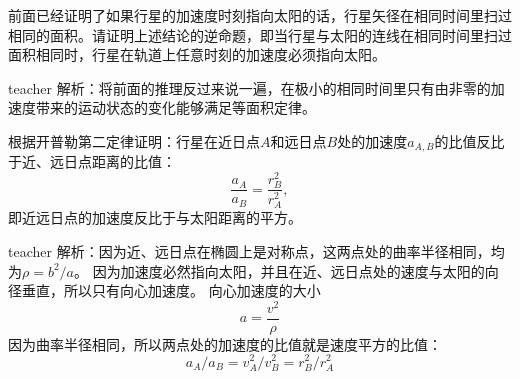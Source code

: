 \begin{example}
前面已经证明了如果行星的加速度时刻指向太阳的话，行星矢径在相同时间里扫过相同的面积。请证明上述结论的逆命题，即当行星与太阳的连线在相同时间里扫过面积相同时，行星在轨道上任意时刻的加速度必须指向太阳。
\begin{taggedblock}{teacher}
\newline
解析：将前面的推理反过来说一遍，在极小的相同时间里只有由非零的加速度带来的运动状态的变化能够满足等面积定律。
\end{taggedblock}
\end{example}




\begin{example}
根据开普勒第二定律证明：行星在近日点$A$和远日点$B$处的加速度$a_{A,B}$的比值反比于近、远日点距离的比值：
\[\frac{a_A}{a_B} = \frac{r_B^2}{r_A^2},\]
即近远日点的加速度反比于与太阳距离的平方。
\begin{taggedblock}{teacher}
\newline
解析：因为近、远日点在椭圆上是对称点，这两点处的曲率半径相同，均为$\rho = b^2/a$。
因为加速度必然指向太阳，并且在近、远日点处的速度与太阳的向径垂直，所以只有向心加速度。
向心加速度的大小
\[a = \frac{v^2}{\rho}\]
因为曲率半径相同，所以两点处的加速度的比值就是速度平方的比值：
\[a_A/a_B = v_A^2/v_B^2 = r_B^2/r_A^2\]
\end{taggedblock}
\end{example}


